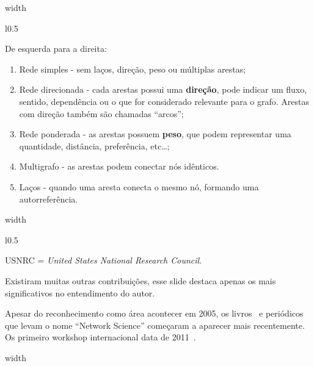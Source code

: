 \documentclass[10pt,a4paper,final]{article}
\newcommand\disappearingrule{%
  \par %
  \vskip10pt %
  \leaders\vrule width \textwidth\vskip0.4pt %
  \nointerlineskip %
  \vskip10pt %
}
\begin{document}
\disappearingrule

\begin{minipage}[t][18\baselineskip]{\linewidth}
  \begin{wrapfigure}{l}{0.5\textwidth}
  \end{wrapfigure}

  De esquerda para a direita:

  \begin{enumerate}
    \item Rede simples - sem laços, direção, peso ou múltiplas arestas;
    \item Rede direcionada - cada arestas possui uma \textbf{direção}, pode indicar um fluxo, sentido, dependência ou o que for considerado relevante para o grafo. Arestas com direção também são chamadas \enquote{arcos};
    \item Rede ponderada - as arestas possuem \textbf{peso}, que podem representar uma quantidade, distância, preferência, etc\ldots;
    \item Multigrafo - as arestas podem conectar nós idênticos.
    \item Laços - quando uma aresta conecta o mesmo nó, formando uma autorreferência.
  \end{enumerate}  
\end{minipage}

\disappearingrule

\begin{minipage}[t][18\baselineskip]{\linewidth}
  \begin{wrapfigure}{l}{0.5\textwidth}
  \end{wrapfigure}

  USNRC = \textit{United States National Research Council}.
  
  Existiram muitas outras contribuições, esse slide destaca apenas os mais significativos no entendimento do autor.
  
  Apesar do reconhecimento como área acontecer em 2005, os livros~\cite{Barabasi2016-rn} e periódicos~\cite{Facebookcomspringeropn2016-wf} que levam o nome \enquote{Network Science} começaram a aparecer mais recentemente. Os primeiro workshop internacional data de 2011~\cite{Ieee2011-ti}.
\end{minipage}

\disappearingrule
\end{document}
